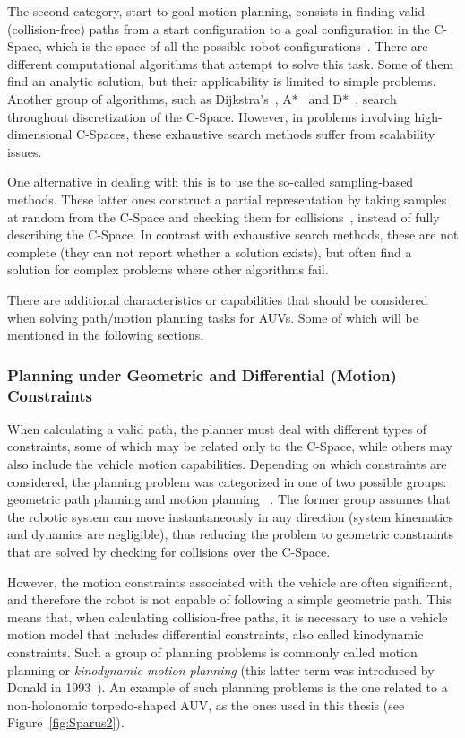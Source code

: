 The second category, \ie start-to-goal motion planning, consists in finding
valid (collision-free) paths from a start configuration to a goal configuration
in the \ac{C-Space}, which is the space of all the possible robot
configurations~\cite{Lozano-Perez1983}. There are different computational
algorithms that attempt to solve this task. Some of them find an analytic
solution, but their applicability is limited to simple problems. Another group
of algorithms, such as Dijkstra's~\cite{Dijkstra1959}, A*~\cite{Hart1968} and
D*~\cite{Stentz1994}, search throughout discretization of the \ac{C-Space}.
However, in problems involving high-dimensional \acp{C-Space}, these exhaustive
search methods suffer from scalability issues.

One alternative in dealing with this is to use the so-called sampling-based
methods. These latter ones construct a partial representation by taking samples
at random from the \ac{C-Space} and checking them for
collisions~\cite{Choset2005,LaValle2006}, instead of fully describing the
\ac{C-Space}. In contrast with exhaustive search methods, these are not complete
(\ie they can not report whether a solution exists), but often find a
solution for complex problems where other algorithms fail.

There are additional characteristics or capabilities that should be considered
when solving path/motion planning tasks for \acp{AUV}. Some of which will be
mentioned in the following sections.

\subsubsection{Planning under Geometric and Differential (Motion) Constraints}
\label{sec:PlannUnderConst}

When calculating a valid path, the planner must deal with different types of
constraints, some of which may be related only to the \ac{C-Space}, while others
may also include the vehicle motion capabilities. Depending on which constraints
are considered, the planning problem was categorized in one of two possible
groups: geometric path planning and motion planning ~\cite{Choset2005}. The
former group assumes that the robotic system can move instantaneously in any
direction (\ie system kinematics and dynamics are negligible), thus reducing the
problem to geometric constraints that are solved by checking for collisions over
the \ac{C-Space}.

However, the motion constraints associated with the vehicle are often
significant, and therefore the robot is not capable of following a simple
geometric path. This means that, when calculating collision-free paths, it is
necessary to use a vehicle motion model that includes differential constraints,
also called kinodynamic constraints. Such a group of planning problems is
commonly called motion planning or \textit{kinodynamic motion planning} (this
latter term was introduced by Donald \etal in 1993~\cite{Donald1993}). An
example of such planning problems is the one related to a non-holonomic
torpedo-shaped \ac{AUV}, as the ones used in this thesis (see
Figure~\ref{fig:Sparus2}).


